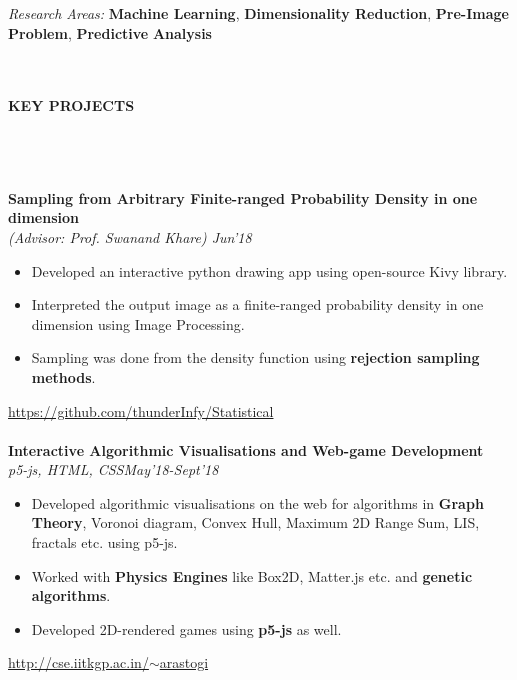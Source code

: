\documentclass[letter,10pt]{book}
\newcommand{\lsep}{-0.5cm}
\newcommand{\resheading}[1]{{\small \colorbox{mygrey}{\begin{minipage}{0.975\textwidth}{\textbf{#1 \vphantom{p\^{E}}}}\end{minipage}}}}
\begin{document}
\emph{Research Areas:}  \textbf{Machine Learning}, \textbf{Dimensionality Reduction},
\textbf{Pre-Image Problem},  \textbf{Predictive}  \textbf{Analysis}
\\
\hspace{0cm}\\[-0.5cm]\\
\resheading{\textbf{ KEY PROJECTS } }\\[\lsep]
\\\\ \large \textbf{Sampling from Arbitrary Finite-ranged Probability Density in one dimension} \normalsize\\
\emph{(Advisor: Prof. Swanand Khare) \hfill Jun'18} \\[-2em] 
\begin{itemize}
\item Developed an interactive python drawing app using open-source Kivy library.\\[-2em]
\item Interpreted the output image as a finite-ranged probability density in one dimension using Image Processing.\\[-2em]
\item Sampling was done from the density function using  \textbf{rejection sampling methods}.\\[-1.8em]
\end{itemize}
\href{https://github.com/thunderInfy/Statistical}{https://github.com/thunderInfy/Statistical}
\\\\ \large \textbf{Interactive Algorithmic Visualisations and Web-game Development} \normalsize\\
\emph{p5-js, HTML, CSS\hfill May'18-Sept'18} \\[-2em]
\begin{itemize}
\item Developed algorithmic visualisations on the web for algorithms in \textbf{Graph Theory}, Voronoi diagram, Convex Hull, Maximum 2D Range Sum, LIS, fractals etc. using p5-js.\\[-2em]
\item Worked with \textbf{Physics Engines} like Box2D, Matter.js etc. and \textbf{genetic algorithms}.\\[-2em]
\item Developed 2D-rendered games using  \textbf{p5-js} as well.\\[-1.8em]
\end{itemize}
\href{http://cse.iitkgp.ac.in/~arastogi}{http://cse.iitkgp.ac.in/$\sim$arastogi}
\end{document}
